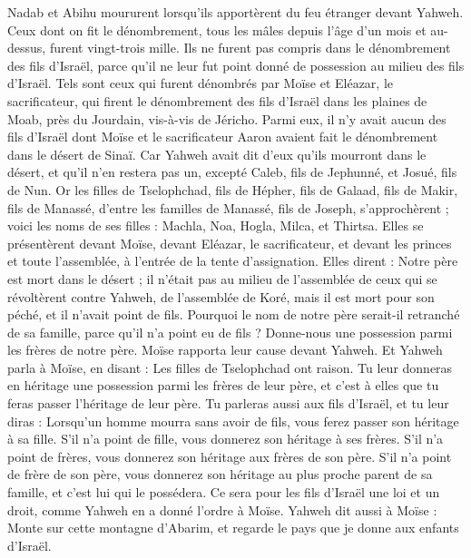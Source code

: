 \begin{multicols}{2}
Nadab et Abihu moururent lorsqu’ils apportèrent du feu étranger devant Yahweh.
Ceux dont on fit le dénombrement, tous les mâles depuis l’âge d’un mois et au-dessus, furent vingt-trois mille. Ils ne furent pas compris dans le dénombrement des fils d’Israël, parce qu’il ne leur fut point donné de possession au milieu des fils d’Israël.
Tels sont ceux qui furent dénombrés par Moïse et Eléazar, le sacrificateur, qui firent le dénombrement des fils d'Israël dans les plaines de Moab, près du Jourdain, vis-à-vis de Jéricho.
Parmi eux, il n’y avait aucun des fils d’Israël dont Moïse et le sacrificateur Aaron avaient fait le dénombrement dans le désert de Sinaï.
Car Yahweh avait dit d'eux qu’ils mourront dans le désert, et qu’il n'en restera pas un, excepté Caleb, fils de Jephunné, et Josué, fils de Nun.
\VerseOne{}Or les filles de Tselophchad, fils de Hépher, fils de Galaad, fils de Makir, fils de Manassé, d'entre les familles de Manassé, fils de Joseph, s'approchèrent ; voici les noms de ses filles : Machla, Noa, Hogla, Milca, et Thirtsa.
Elles se présentèrent devant Moïse, devant Eléazar, le sacrificateur, et devant les princes et toute l'assemblée, à l'entrée de la tente d'assignation. Elles dirent :
Notre père est mort dans le désert ; il n’était pas au milieu de l’assemblée de ceux qui se révoltèrent contre Yahweh, de l'assemblée de Koré, mais il est mort pour son péché, et il n'avait point de fils.
Pourquoi le nom de notre père serait-il retranché de sa famille, parce qu'il n'a point eu de fils ? Donne-nous une possession parmi les frères de notre père.
Moïse rapporta leur cause devant Yahweh.
Et Yahweh parla à Moïse, en disant :
Les filles de Tselophchad ont raison. Tu leur donneras en héritage une possession parmi les frères de leur père, et c’est à elles que tu feras passer l'héritage de leur père.
Tu parleras aussi aux fils d'Israël, et tu leur diras : Lorsqu’un homme mourra sans avoir de fils, vous ferez passer son héritage à sa fille.
S'il n'a point de fille, vous donnerez son héritage à ses frères.
S'il n'a point de frères, vous donnerez son héritage aux frères de son père.
S’il n’a point de frère de son père, vous donnerez son héritage au plus proche parent de sa famille, et c’est lui qui le possédera. Ce sera pour les fils d'Israël une loi et un droit, comme Yahweh en a donné l’ordre à Moïse.
Yahweh dit aussi à Moïse : Monte sur cette montagne d'Abarim, et regarde le pays que je donne aux enfants d'Israël.

\end{multicols}
